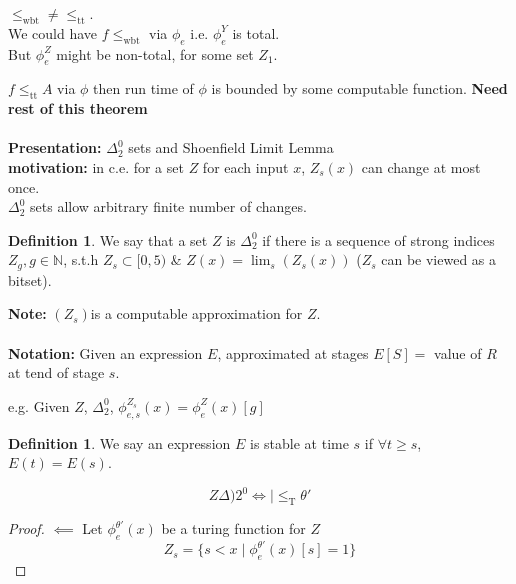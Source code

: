\documentclass{article}
\newcommand{\N}{\mathbb{N}}
\newcommand{\tr}{\leq_\mathrm{T}}
\theoremstyle{definition}
\newtheorem{definition}[theorem]{Definition}
\theoremstyle{remark}
\theoremstyle{example}
\begin{document}
 	$\leq_\mathrm{wbt} \neq \leq_\mathrm{tt}$.\\
 	We could have $f \leq_{\mathrm{wbt}}$ via $\phi_e$ i.e. $\phi_e^Y$ is total.\\
 	But $\phi_e^Z$ might be non-total, for some set $Z_1$.
 	
 	$f \leq_\mathrm{tt} A$ via $\phi$ then run time of $\phi$ is bounded by some computable function. \textbf{Need rest of this theorem}
 	\\
 	\\
 	\textbf{Presentation:}
 	$\Delta_2^0$ sets and Shoenfield Limit Lemma\\
 	\textbf{motivation:}
 	in c.e. for a set $Z$ for each input $x$, $Z_s(x)$ can change at most once.\\
 	$\Delta_2^0$ sets allow arbitrary finite number of changes.\\
 	\begin{definition}
 		We say that a set $Z$ is $\Delta_2^0$ if there is a sequence of strong indices $Z_g, g \in \N$, s.t.h $Z_s \subset [0,5)$ \& $Z(x)=\lim_s(Z_s(x))$ ($Z_s$ can be viewed as a bitset).\\
 		
 	\end{definition}
 	\textbf{Note:} $(Z_s)$is a computable approximation for $Z$.\\\\
 	\textbf{Notation:} Given an expression $E$, approximated at stages $E[S] =$ value of $R$ at tend of stage $s$. 
 	
 	e.g. Given $Z$, $\Delta_2^0$, $\phi_{e,s}^{Z_s}(x)=\phi_e^Z(x)[g]$
 	
 	\begin{definition}
 		We say an expression $E$ is stable at time $s$ if $\forall t \geq s$, $E(t)=E(s)$.
 	\end{definition}
 
 	\[Z \Delta)2^0 \iff | \tr \theta' \]
 	
 	\begin{proof}
 		$\impliedby$ Let $\phi_e^{\theta'}(x) $ be a turing function for $Z$
 		\[ Z_s = \{s < x \mid \phi_e^{\theta'} (x)[s] =1 \} \]
 	\end{proof}
\end{document}
